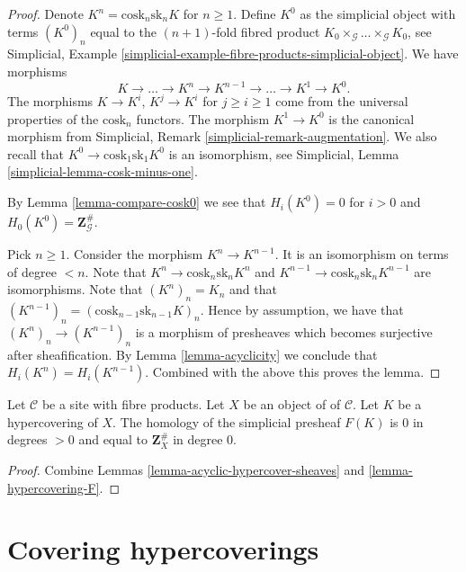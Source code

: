 \begin{proof}
Denote $K^n = \text{cosk}_n \text{sk}_n K$ for $n \geq 1$.
Define $K^0$ as the simplicial object with terms
$(K^0)_n$ equal to the $(n + 1)$-fold fibred product
$K_0 \times_\mathcal{G} \ldots \times_\mathcal{G} K_0$,
see Simplicial,
Example \ref{simplicial-example-fibre-products-simplicial-object}.
We have morphisms
$$
K \longrightarrow \ldots \to K^n \to K^{n - 1} \to \ldots \to K^1 \to K^0.
$$
The morphisms $K \to K^i$, $K^j \to K^i$ for $j \geq i \geq 1$ come
from the universal properties of the $\text{cosk}_n$ functors.
The morphism $K^1 \to K^0$ is the canonical morphism
from
Simplicial, Remark \ref{simplicial-remark-augmentation}.
We also recall that $K^0 \to \text{cosk}_1 \text{sk}_1 K^0$
is an isomorphism, see
Simplicial, Lemma \ref{simplicial-lemma-cosk-minus-one}.

\medskip\noindent
By Lemma \ref{lemma-compare-cosk0} we see that
$H_i(K^0) = 0$ for $i > 0$ and $H_0(K^0) = \mathbf{Z}_\mathcal{G}^\#$.

\medskip\noindent
Pick $n \geq 1$. Consider the morphism $K^n \to K^{n - 1}$.
It is an isomorphism on terms of degree $< n$.
Note that $K^n \to \text{cosk}_n \text{sk}_n K^n$ and
$K^{n - 1} \to \text{cosk}_n \text{sk}_n K^{n - 1}$
are isomorphisms. Note that $(K^n)_n = K_n$ and
that $(K^{n - 1})_n = (\text{cosk}_{n - 1} \text{sk}_{n - 1} K)_n$.
Hence by assumption, we have that $(K^n)_n \to (K^{n - 1})_n$
is a morphism of presheaves which becomes surjective after
sheafification. By Lemma \ref{lemma-acyclicity} we conclude that
$H_i(K^n) = H_i(K^{n - 1})$.
Combined with the above this proves the lemma.
\end{proof}

\begin{lemma}
\label{lemma-hypercovering-acyclic}
Let $\mathcal{C}$ be a site with fibre products.
Let $X$ be an object of of $\mathcal{C}$.
Let $K$ be a hypercovering of $X$.
The homology of the simplicial presheaf $F(K)$ is
$0$ in degrees $> 0$ and equal to $\mathbf{Z}_X^\#$
in degree $0$.
\end{lemma}

\begin{proof}
Combine Lemmas \ref{lemma-acyclic-hypercover-sheaves}
and \ref{lemma-hypercovering-F}.
\end{proof}







\section{Covering hypercoverings}
\label{section-covering}

